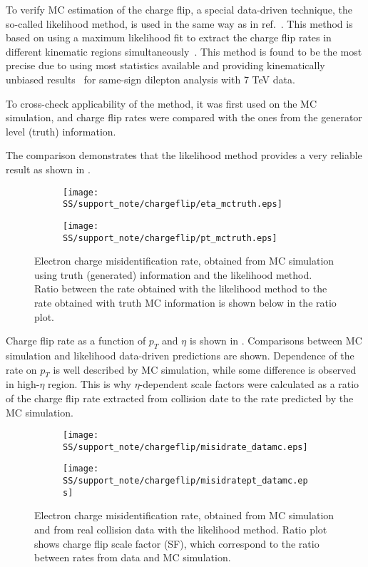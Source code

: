 To verify MC estimation of the charge flip, a special data-driven technique, the so-called likelihood method, 
is used in the same way as in ref.~\cite{same_sign_paper_7tev}.
This method is based on using a maximum likelihood fit to extract the charge flip rates in different kinematic regions simultaneously~\cite{cf_top_paper}.
This method is found to be the most precise due to using most statistics available and providing kinematically unbiased results~\cite{anthony_thesis} 
for same-sign dilepton analysis with 7 TeV data.

To cross-check applicability of the method, it was first used on 
the MC simulation, and charge flip rates were compared with the ones from the generator level (truth) information. 

The comparison demonstrates that the likelihood method provides a very reliable result as shown in
.

\begin{figure}
\begin{subfigure}{.5\textwidth}
  \centering
  \texttt{[image: SS/support\_note/chargeflip/eta\_mctruth.eps]}
\end{subfigure}%
\begin{subfigure}{.5\textwidth}
  \centering
  \texttt{[image: SS/support\_note/chargeflip/pt\_mctruth.eps]}
\end{subfigure}
\caption{Electron charge misidentification rate, obtained from MC simulation using truth (generated) information and the likelihood method. 
Ratio between the rate obtained with the likelihood method to the rate obtained with truth MC information is shown below in the ratio plot. }
\label{fig:likelihood_cross_check}
\end{figure}

Charge flip rate as a function of $p_T$ and $\eta$ is shown in .
Comparisons between MC simulation and likelihood data-driven predictions are shown. 
Dependence of the rate on $p_T$ is well described by MC simulation, while some difference is observed
in high-$\eta$ region. This is why $\eta$-dependent scale factors were calculated as a ratio of the charge flip rate extracted from collision date 
to the rate predicted by the MC simulation.

\begin{figure}
\begin{subfigure}{.5\textwidth}
  \centering
  \texttt{[image: SS/support\_note/chargeflip/misidrate\_datamc.eps]}
\end{subfigure}%
\begin{subfigure}{.5\textwidth}
  \centering
  \texttt{[image: SS/support\_note/chargeflip/misidratept\_datamc.eps]}
\end{subfigure}
\caption{Electron charge misidentification rate, obtained from MC simulation and from real collision data with the likelihood method.
Ratio plot shows charge flip scale factor (SF), which correspond to the ratio between rates from data and MC simulation.}
\label{fig:charge_flip_data_vs_mc}
\end{figure}

